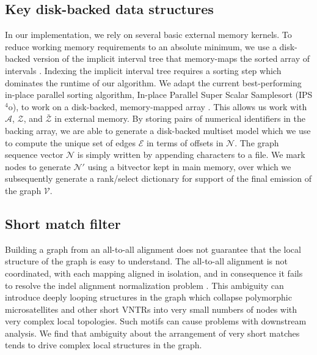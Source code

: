 \documentclass{bioinfo}
\theoremstyle{definition}
\begin{document}
\subsection{Key disk-backed data structures}

In our implementation, we rely on several basic external memory kernels.
To reduce working memory requirements to an absolute minimum, we use a disk-backed version of the implicit interval tree that memory-maps the sorted array of intervals \citep{mmmulti}.
Indexing the implicit interval tree requires a sorting step which dominates the runtime of our algorithm.
We adapt the current best-performing in-place parallel sorting algorithm, In-place Parallel Super Scalar Samplesort (IPS$^4$o), to work on a disk-backed, memory-mapped array \citep{axtmann2017}.
This allows us work with $\mathcal{A}$, $\mathcal{Z}$, and $\bar{\mathcal{Z}}$ in external memory.
By storing pairs of numerical identifiers in the backing array, we are able to generate a disk-backed multiset model which we use to compute the unique set of edges $\mathcal{E}$ in terms of offsets in $\mathcal{N}$.
The graph sequence vector $\mathcal{N}$ is simply written by appending characters to a file.
We mark nodes to generate $\mathcal{N}'$ using a bitvector kept in main memory, over which we subsequently generate a rank/select dictionary \citep{Gog_2014} for support of the final emission of the graph $\mathcal{V}$.

\subsection{Short match filter}

Building a graph from an all-to-all alignment does not guarantee that the local structure of the graph is easy to understand.
The all-to-all alignment is not coordinated, with each mapping aligned in isolation, and in consequence it fails to resolve the indel alignment normalization problem \citep{Mose_2019}.
This ambiguity can introduce deeply looping structures in the graph which collapse polymorphic microsatellites and other short VNTRs into very small numbers of nodes with very complex local topologies.
Such motifs can cause problems with downstream analysis.
We find that ambiguity about the arrangement of very short matches tends to drive complex local structures in the graph.
\end{document}
